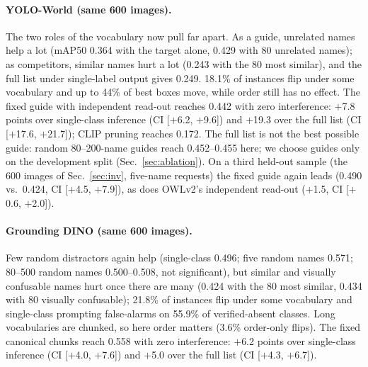 \documentclass[10pt,twocolumn,letterpaper]{article}
\begin{document}
\paragraph{YOLO-World (same 600 images).} The two roles of the vocabulary now pull far apart. As a guide, unrelated
names help a lot (mAP50 0.364 with the target alone, 0.429 with 80 unrelated names); as competitors, similar names
hurt a lot (0.243 with the 80 most similar), and the full list under single-label output gives 0.249. 18.1\% of
instances flip under some vocabulary and up to 44\% of best boxes move, while order still has no effect. The fixed
guide with independent read-out reaches 0.442 with zero interference: $+$7.8 points over single-class inference (CI
[$+$6.2, $+$9.6]) and $+$19.3 over the full list (CI [$+$17.6, $+$21.7]); CLIP pruning reaches 0.172. The full list is
not the best possible guide: random 80--200-name guides reach 0.452--0.455 here; we choose guides only on the
development split (Sec.~\ref{sec:ablation}). On a third held-out sample (the 600 images of Sec.~\ref{sec:inv}, five-name requests) the fixed guide again leads (0.490 vs.\ 0.424, CI [$+$4.5, $+$7.9]), as does OWLv2's independent read-out ($+$1.5, CI [$+$0.6, $+$2.0]).

\paragraph{Grounding DINO (same 600 images).} Few random distractors again help (single-class 0.496; five random names
0.571; 80--500 random names 0.500--0.508, not significant), but similar and visually confusable names hurt once there are many (0.424 with the 80 most similar, 0.434 with
80 visually confusable); 21.8\% of instances flip under some vocabulary and single-class prompting false-alarms on
55.9\% of verified-absent classes. Long vocabularies are chunked, so here order matters (3.6\% order-only flips). The
fixed canonical chunks reach 0.558 with zero interference: $+$6.2 points over single-class inference (CI [$+$4.0,
$+$7.6]) and $+$5.0 over the full list (CI [$+$4.3, $+$6.7]).
\end{document}
